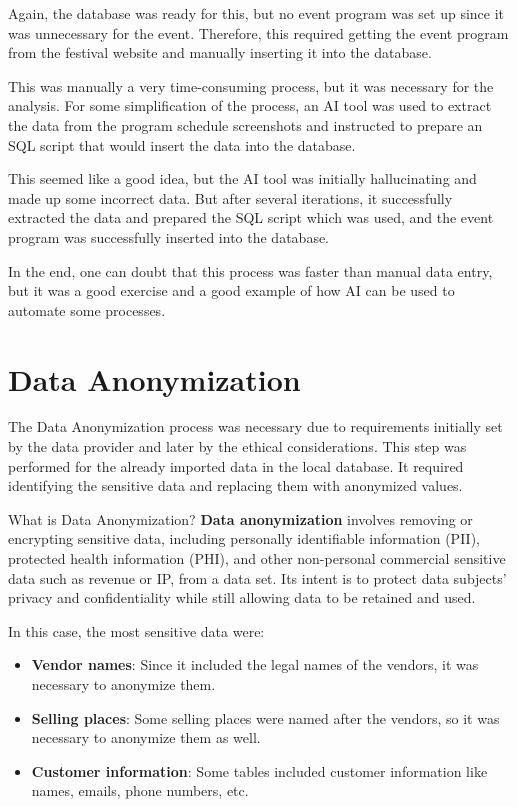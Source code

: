 Again, the database was ready for this, but no event program was set up since it was unnecessary for the event.
Therefore, this required getting the event program from the festival website and manually inserting it into the database.

This was manually a very time-consuming process, but it was necessary for the analysis.
For some simplification of the process, an AI tool was used to extract the data from the program schedule screenshots and instructed to prepare an SQL script that would insert the data into the database.

This seemed like a good idea, but the AI tool was initially hallucinating and made up some incorrect data.
But after several iterations, it successfully extracted the data and prepared the SQL script which was used, and the event program was successfully inserted into the database.

In the end, one can doubt that this process was faster than manual data entry, but it was a good exercise and a good example of how AI can be used to automate some processes.

\pagebreak[4]


\section{Data Anonymization}
\label{sec:data-methodology-anonymization}
The Data Anonymization process was necessary due to requirements initially set by the data provider and later by the ethical considerations.
This step was performed for the already imported data in the local database.
It required identifying the sensitive data and replacing them with anonymized values.

\begin{infobox}{What is Data Anonymization?}
	\textbf{Data anonymization} involves removing or encrypting sensitive data, including personally identifiable information (PII), protected health information (PHI), and other non-personal commercial sensitive data such as revenue or IP, from a data set.
	Its intent is to protect data subjects' privacy and confidentiality while still allowing data to be retained and used\cite{hd_data_anonymization_techniques}.
\end{infobox}

In this case, the most sensitive data were:
\begin{itemize}
	\item \textbf{Vendor names}: Since it included the legal names of the vendors, it was necessary to anonymize them.
	\item \textbf{Selling places}: Some selling places were named after the vendors, so it was necessary to anonymize them as well.
	\item \textbf{Customer information}: Some tables included customer information like names, emails, phone numbers, etc.
\end{itemize}

